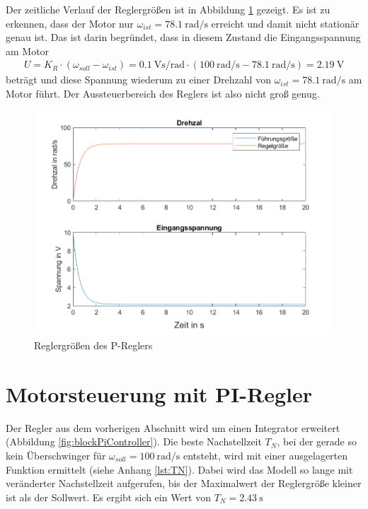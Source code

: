 \documentclass[
    paper=a4,
    fontsize=10pt,
    DIV=12,
    oneside,
]{scrartcl}
\begin{document}
    Der zeitliche Verlauf der Reglergrößen ist in Abbildung \ref{fig:graphPController} gezeigt. Es ist zu erkennen, dass der Motor nur \(\omega_{ist} = \SI{78,1}{\radian\per\second}\) erreicht und damit nicht stationär genau ist. Das ist darin begründet, dass in diesem Zustand die Eingangsspannung am Motor 
    \begin{align}
        U = K_R \cdot (\omega_{soll} - \omega_{ist}) = \SI{0.1}{\volt\second\per\radian} \cdot \left( \SI{100}{\radian\per\second} - \SI{78.1}{\radian\per\second} \right) = \SI{2.19}{\volt}
    \end{align}
    beträgt und diese Spannung wiederum zu einer Drehzahl von \(\omega_{ist} = \SI{78,1}{\radian\per\second}\) am Motor führt. Der Aussteuerbereich des Reglers ist also nicht groß genug.

    \begin{figure}[hbt]
        \centering
        \includegraphics[width=\imagewidth]{../versuch3/graphPController}
        \caption{Reglergrößen des P-Reglers}
        \label{fig:graphPController}
    \end{figure}   

\section{Motorsteuerung mit PI-Regler}
    Der Regler aus dem vorherigen Abschnitt wird um einen Integrator erweitert (Abbildung \ref{fig:blockPiController}). Die beste Nachstellzeit \(T_N\), bei der gerade so kein Überschwinger für \(\omega_{soll} = \SI{100}{\radian\per\second}\) entsteht, wird mit einer ausgelagerten Funktion ermittelt (siehe Anhang \ref{lst:TN}). Dabei wird das Modell so lange mit veränderter Nachstellzeit aufgerufen, bis der Maximalwert der Reglergröße kleiner ist als der Sollwert. Es ergibt sich ein Wert von \(T_N = \SI{2.43}{\second}\)
\end{document}
